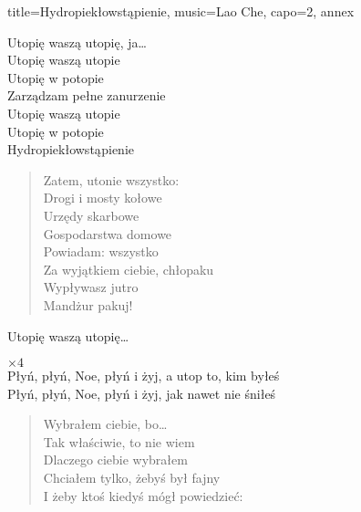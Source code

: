 \begin{song}{title={Hydropiekłowstąpienie}, music={Lao Che}, capo=2, annex}
\begin{multicols}{2}
\begin{chorus}
        Utopię waszą utopię, ja\ldots \smallskip \\
        Utopię waszą utopie \\
        Utopię w potopie \\
        Zarządzam pełne zanurzenie \smallskip \\
        Utopię waszą utopie \\
        Utopię w potopie \\
        Hydropiekłowstąpienie
    \end{chorus}
        \vfill\null\columnbreak{}
    \begin{verse}
        Zatem, utonie wszystko: \smallskip \\
        Drogi i mosty kołowe \\
        Urzędy skarbowe \\
        Gospodarstwa domowe \smallskip \\
        Powiadam: wszystko \\
        Za wyjątkiem ciebie, chłopaku \\
        Wypływasz jutro \\
        Mandżur pakuj!
    \end{verse}
    \begin{chorus}
        Utopię waszą utopię\ldots
    \end{chorus}
    \begin{interlude}
            $\times 4$ \medskip \\
        Płyń, płyń, Noe, płyń i żyj, a utop to, kim byłeś \\
        Płyń, płyń, Noe, płyń i żyj, jak nawet nie śniłeś
    \end{interlude}
    \begin{verse}
        Wybrałem ciebie, bo\ldots \\
        Tak właściwie, to nie wiem \\
        Dlaczego ciebie wybrałem \smallskip \\
        Chciałem tylko, żebyś był fajny \\
        I żeby ktoś kiedyś mógł powiedzieć: \smallskip \\
    \end{verse}

\end{multicols}
\end{song}
